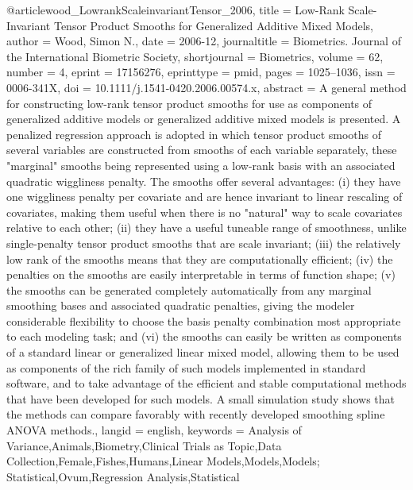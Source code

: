 @article{wood_LowrankScaleinvariantTensor_2006,
  title = {Low-Rank Scale-Invariant Tensor Product Smooths for Generalized Additive Mixed Models},
  author = {Wood, Simon N.},
  date = {2006-12},
  journaltitle = {Biometrics. Journal of the International Biometric Society},
  shortjournal = {Biometrics},
  volume = {62},
  number = {4},
  eprint = {17156276},
  eprinttype = {pmid},
  pages = {1025--1036},
  issn = {0006-341X},
  doi = {10.1111/j.1541-0420.2006.00574.x},
  abstract = {A general method for constructing low-rank tensor product smooths for use as components of generalized additive models or generalized additive mixed models is presented. A penalized regression approach is adopted in which tensor product smooths of several variables are constructed from smooths of each variable separately, these "marginal" smooths being represented using a low-rank basis with an associated quadratic wiggliness penalty. The smooths offer several advantages: (i) they have one wiggliness penalty per covariate and are hence invariant to linear rescaling of covariates, making them useful when there is no "natural" way to scale covariates relative to each other; (ii) they have a useful tuneable range of smoothness, unlike single-penalty tensor product smooths that are scale invariant; (iii) the relatively low rank of the smooths means that they are computationally efficient; (iv) the penalties on the smooths are easily interpretable in terms of function shape; (v) the smooths can be generated completely automatically from any marginal smoothing bases and associated quadratic penalties, giving the modeler considerable flexibility to choose the basis penalty combination most appropriate to each modeling task; and (vi) the smooths can easily be written as components of a standard linear or generalized linear mixed model, allowing them to be used as components of the rich family of such models implemented in standard software, and to take advantage of the efficient and stable computational methods that have been developed for such models. A small simulation study shows that the methods can compare favorably with recently developed smoothing spline ANOVA methods.},
  langid = {english},
  keywords = {Analysis of Variance,Animals,Biometry,Clinical Trials as Topic,Data Collection,Female,Fishes,Humans,Linear Models,Models,Models; Statistical,Ovum,Regression Analysis,Statistical}
}

